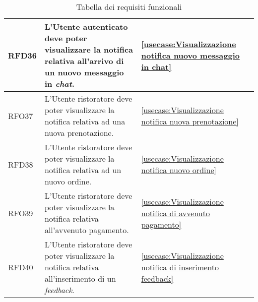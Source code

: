 \begin{table}[H]
\begin{tabularx}{\textwidth}{l|X|p{2cm}}
		\hline
		RFD36       & L'Utente autenticato deve poter visualizzare la notifica relativa all'arrivo di un nuovo messaggio in \textit{chat}.       & \autoref{usecase:Visualizzazione notifica nuovo messaggio in chat}                    \\
		\hline
		RFO37       & L'Utente ristoratore deve poter visualizzare la notifica relativa ad una nuova prenotazione.                      & \autoref{usecase:Visualizzazione notifica nuova prenotazione}                               \\
		\hline
		RFD38       & L'Utente ristoratore deve poter visualizzare la notifica relativa ad un nuovo ordine.                             & \autoref{usecase:Visualizzazione notifica nuovo ordine}                               \\
		\hline
		RFO39       & L'Utente ristoratore deve poter visualizzare la notifica relativa all'avvenuto pagamento.                         & \autoref{usecase:Visualizzazione notifica di avvenuto pagamento}                      \\
		\hline
		RFD40       & L'Utente ristoratore deve poter visualizzare la notifica relativa all'inserimento di un \textit{feedback}.                 & \autoref{usecase:Visualizzazione notifica di inserimento feedback}                    \\
	\end{tabularx}
	\caption{Tabella dei requisiti funzionali}
\end{table}


